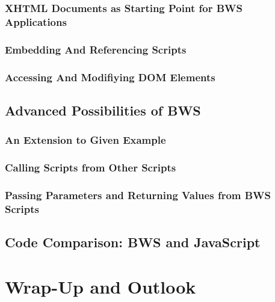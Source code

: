   \subsubsection{XHTML Documents as Starting Point for BWS Applications}

  

  \subsubsection{Embedding And Referencing Scripts}

 

  \subsubsection{Accessing And Modifiying DOM Elements}


 \subsection{Advanced Possibilities of BWS}
  \subsubsection{An Extension to Given Example}
  \subsubsection{Calling Scripts from Other Scripts}
  \subsubsection{Passing Parameters and Returning Values from BWS Scripts}
 \subsection{Code Comparison: BWS and JavaScript}
\section{Wrap-Up and Outlook}